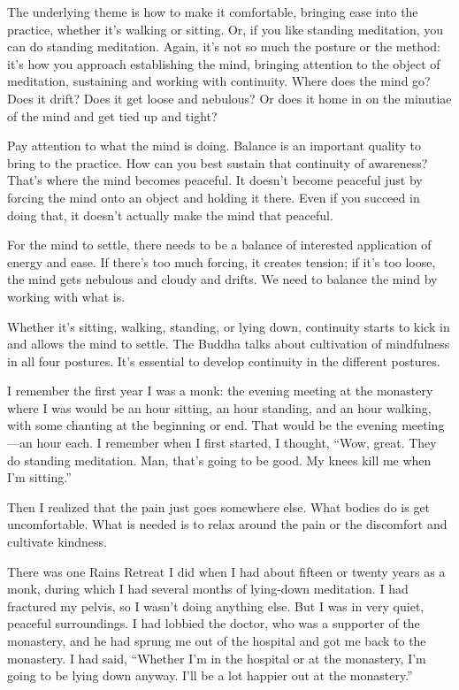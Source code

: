 The underlying theme is how to make it comfortable, bringing ease into
the practice, whether it’s walking or sitting. Or, if you like standing
meditation, you can do standing meditation. Again, it’s not so much the
posture or the method: it’s how you approach establishing the mind,
bringing attention to the object of meditation, sustaining and working
with continuity. Where does the mind go? Does it drift? Does it get
loose and nebulous? Or does it home in on the minutiae of the mind and
get tied up and tight?

Pay attention to what the mind is doing. Balance is an important quality
to bring to the practice. How can you best sustain that continuity of
awareness? That’s where the mind becomes peaceful. It doesn’t become
peaceful just by forcing the mind onto an object and holding it there.
Even if you succeed in doing that, it doesn’t actually make the mind
that peaceful.

For the mind to settle, there needs to be a balance of interested
application of energy and ease. If there’s too much forcing, it creates
tension; if it’s too loose, the mind gets nebulous and cloudy and
drifts. We need to balance the mind by working with what is.

Whether it’s sitting, walking, standing, or lying down, continuity
starts to kick in and allows the mind to settle. The Buddha talks about
cultivation of mindfulness in all four postures. It’s essential to
develop continuity in the different postures.

I remember the first year I was a monk: the evening meeting at the
monastery where I was would be an hour sitting, an hour standing, and an
hour walking, with some chanting at the beginning or end. That would be
the evening meeting—an hour each. I remember when I first started, I
thought, “Wow, great. They do standing meditation. Man, that’s going to
be good. My knees kill me when I’m sitting.”

Then I realized that the pain just goes somewhere else. What bodies do
is get uncomfortable. What is needed is to relax around the pain or the
discomfort and cultivate kindness.

There was one Rains Retreat I did when I had about fifteen or twenty
years as a monk, during which I had several months of lying-down
meditation. I had fractured my pelvis, so I wasn’t doing anything else.
But I was in very quiet, peaceful surroundings. I had lobbied the
doctor, who was a supporter of the monastery, and he had sprung me out
of the hospital and got me back to the monastery. I had said, “Whether
I’m in the hospital or at the monastery, I’m going to be lying down
anyway. I’ll be a lot happier out at the monastery.”

